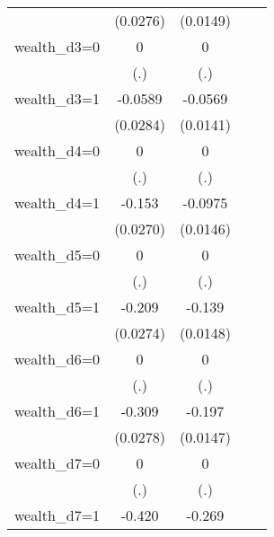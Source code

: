 \begin{table}[htbp]
\begin{tabular}{l*{4}{c}}
                & (0.0276)         & (0.0149)         &                  &                  \\
wealth\_d3=0     &        0         &        0         &                  &                  \\
                &      (.)         &      (.)         &                  &                  \\
wealth\_d3=1     &  -0.0589\sym{**} &  -0.0569\sym{***}&                  &                  \\
                & (0.0284)         & (0.0141)         &                  &                  \\
wealth\_d4=0     &        0         &        0         &                  &                  \\
                &      (.)         &      (.)         &                  &                  \\
wealth\_d4=1     &   -0.153\sym{***}&  -0.0975\sym{***}&                  &                  \\
                & (0.0270)         & (0.0146)         &                  &                  \\
wealth\_d5=0     &        0         &        0         &                  &                  \\
                &      (.)         &      (.)         &                  &                  \\
wealth\_d5=1     &   -0.209\sym{***}&   -0.139\sym{***}&                  &                  \\
                & (0.0274)         & (0.0148)         &                  &                  \\
wealth\_d6=0     &        0         &        0         &                  &                  \\
                &      (.)         &      (.)         &                  &                  \\
wealth\_d6=1     &   -0.309\sym{***}&   -0.197\sym{***}&                  &                  \\
                & (0.0278)         & (0.0147)         &                  &                  \\
wealth\_d7=0     &        0         &        0         &                  &                  \\
                &      (.)         &      (.)         &                  &                  \\
wealth\_d7=1     &   -0.420\sym{***}&   -0.269\sym{***}&                  &                  \\

\end{tabular}
\end{table}
